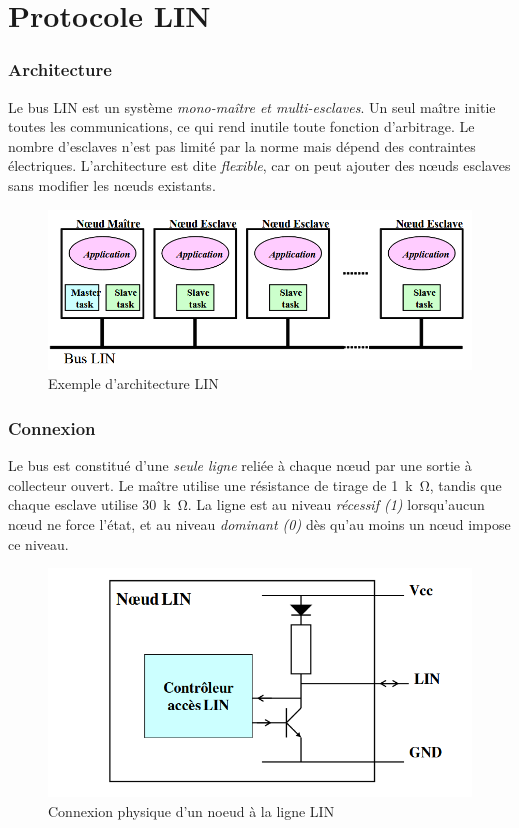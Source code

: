 \section{Protocole LIN}

\subsubsection*{Architecture}  
Le bus LIN est un système \textit{mono-maître et multi-esclaves}. Un seul maître initie toutes les communications, ce qui rend inutile toute fonction d’arbitrage. Le nombre d’esclaves n’est pas limité par la norme mais dépend des contraintes électriques. L’architecture est dite \textit{flexible}, car on peut ajouter des nœuds esclaves sans modifier les nœuds existants.  

\begin{figure}[H]
    \centering
    \includegraphics[width=0.8\linewidth]{images//Intro/Architecture_LIN_ME.png}
    \caption{Exemple d’architecture LIN}
    \label{fig:placeholder}
\end{figure}

\subsubsection*{Connexion}  
Le bus est constitué d’une \textit{seule ligne} reliée à chaque nœud par une sortie à collecteur ouvert. Le maître utilise une résistance de tirage de \SI{1}{k\ohm}, tandis que chaque esclave utilise \SI{30}{k\ohm}. La ligne est au niveau \textit{récessif (1)} lorsqu’aucun nœud ne force l’état, et au niveau \textit{dominant (0)} dès qu’au moins un nœud impose ce niveau.  

\begin{figure}[H]
    \centering
    \includegraphics[width=0.5\linewidth]{images//Intro/Connection_LIN.png}
    \caption{Connexion physique d’un noeud à la ligne LIN}
    \label{fig:placeholder}
\end{figure}

